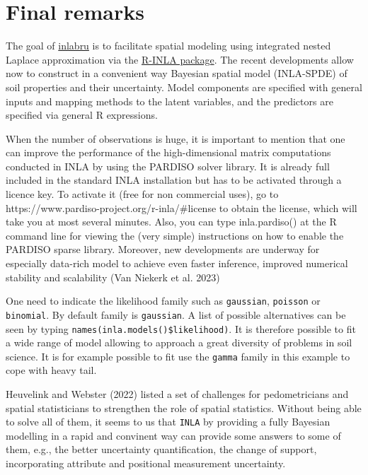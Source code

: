 \documentclass[
  a4paper,
]{article}
\begin{document}
\hypertarget{final-remarks}{%
\section{Final remarks}\label{final-remarks}}

The goal of \href{http://inlabru.org/}{inlabru} is to facilitate spatial
modeling using integrated nested Laplace approximation via the
\href{https://www.r-inla.org/}{R-INLA package}. The recent developments
allow now to construct in a convenient way Bayesian spatial model
(INLA-SPDE) of soil properties and their uncertainty. Model components
are specified with general inputs and mapping methods to the latent
variables, and the predictors are specified via general R expressions.

When the number of observations is huge, it is important to mention that
one can improve the performance of the high-dimensional matrix
computations conducted in INLA by using the PARDISO solver library. It
is already full included in the standard INLA installation but has to be
activated through a licence key. To activate it (free for non commercial
uses), go to https://www.pardiso-project.org/r-inla/\#license to obtain
the license, which will take you at most several minutes. Also, you can
type inla.pardiso() at the R command line for viewing the (very simple)
instructions on how to enable the PARDISO sparse library. Moreover, new
developments are underway for especially data-rich model to achieve even
faster inference, improved numerical stability and scalability (Van
Niekerk et al. 2023)

One need to indicate the likelihood family such as \texttt{gaussian},
\texttt{poisson} or \texttt{binomial}. By default family is
\texttt{gaussian}. A list of possible alternatives can be seen by typing
\texttt{names(inla.models()\$likelihood)}. It is therefore possible to
fit a wide range of model allowing to approach a great diversity of
problems in soil science. It is for example possible to fit use the
\texttt{gamma} family in this example to cope with heavy tail.

Heuvelink and Webster (2022) listed a set of challenges for
pedometricians and spatial statisticians to strengthen the role of
spatial statistics. Without being able to solve all of them, it seems to
us that \texttt{INLA} by providing a fully Bayesian modelling in a rapid
and convinent way can provide some answers to some of them, e.g., the
better uncertainty quantification, the change of support, incorporating
attribute and positional measurement uncertainty.
\end{document}
